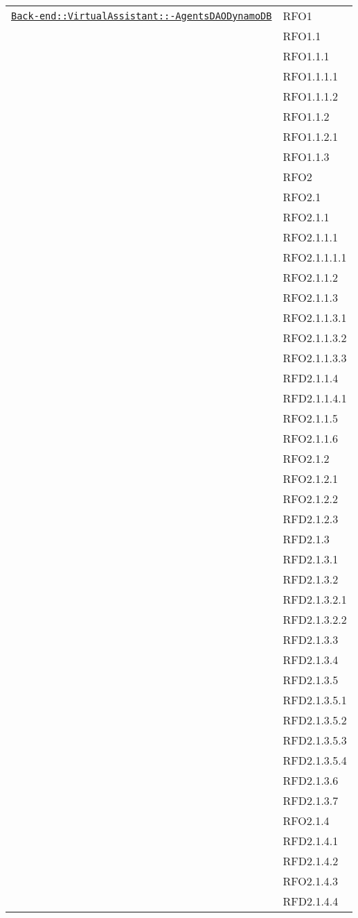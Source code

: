\begin{longtable}{|>{\centering}m{10cm}|m{3cm}<{\centering}|}
\hyperref[Back-end::VirtualAssistant::AgentsDAODynamoDB]{\texttt{Back-end::VirtualAssistant::-\linebreak AgentsDAODynamoDB}} & RFO1\\
& RFO1.1\\
& RFO1.1.1\\
& RFO1.1.1.1\\
& RFO1.1.1.2\\
& RFO1.1.2\\
& RFO1.1.2.1\\
& RFO1.1.3\\
& RFO2\\
& RFO2.1\\
& RFO2.1.1\\
& RFO2.1.1.1\\
& RFO2.1.1.1.1\\
& RFO2.1.1.2\\
& RFO2.1.1.3\\
& RFO2.1.1.3.1\\
& RFO2.1.1.3.2\\
& RFO2.1.1.3.3\\
& RFD2.1.1.4\\
& RFD2.1.1.4.1\\
& RFO2.1.1.5\\
& RFO2.1.1.6\\
& RFO2.1.2\\
& RFO2.1.2.1\\
& RFO2.1.2.2\\
& RFD2.1.2.3\\
& RFD2.1.3\\
& RFD2.1.3.1\\
& RFD2.1.3.2\\
& RFD2.1.3.2.1\\
& RFD2.1.3.2.2\\
& RFD2.1.3.3\\
& RFD2.1.3.4\\
& RFD2.1.3.5\\
& RFD2.1.3.5.1\\
& RFD2.1.3.5.2\\
& RFD2.1.3.5.3\\
& RFD2.1.3.5.4\\
& RFD2.1.3.6\\
& RFD2.1.3.7\\
& RFO2.1.4\\
& RFD2.1.4.1\\
& RFD2.1.4.2\\
& RFO2.1.4.3\\
& RFD2.1.4.4\\

\end{longtable}
